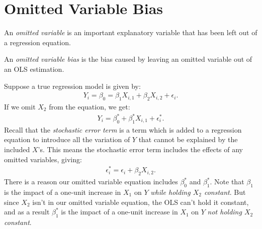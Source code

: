 \documentclass[11pt,twoside,openany]{memoir}
\begin{document}
    \section*{Omitted Variable Bias}
        \begin{definition}
            An \textit{omitted variable} is an important explanatory variable that has been left out of a regression equation.
        \end{definition}

        \begin{definition}
            An \textit{omitted variable bias} is the bias caused by leaving an omitted variable out of an OLS estimation.
        \end{definition}

        \begin{example}
            Suppose a true regression model is given by:
                \begin{equation*}
                \begin{split}
                    Y_i = \beta_0 = \beta_1 X_{i,1} + \beta_2 X_{i,2} + \epsilon_i.
                \end{split}
                \end{equation*}
            If we omit $X_2$ from the equation, we get:
                \begin{equation*}
                \begin{split}
                    Y_i = \beta_0^\ast + \beta_1^\ast X_{i,1} +  \epsilon^\ast_i.
                \end{split}
                \end{equation*}
            Recall that the \textit{stochastic error term} is a term which is added to a regression equation to introduce all the variation of $Y$ that cannot be explained by the included $X$'s. This means the stochastic error term includes the effects of any omitted variables, giving:
                \begin{equation*}
                \begin{split}
                    \epsilon^\ast_i = \epsilon_i + \beta_2 X_{i,2}.
                \end{split}
                \end{equation*}
            There is a reason our omitted variable equation includes $\beta_0^\ast$ and $\beta_1^\ast$. Note that $\beta_1$ is the impact of a one-unit increase in $X_1$ on $Y$ \textit{while holding $X_2$ constant}. But since $X_2$ isn't in our omitted variable equation, the OLS can't hold it constant, and as a result $\beta_1^\ast$ is the impact of a one-unit increase in $X_1$ on $Y$ \textit{not holding $X_2$ constant}.


\end{example}
\end{document}
